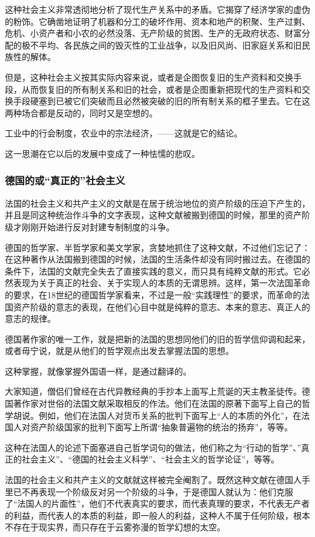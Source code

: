 \documentclass[10pt, UTF8]{book} %
\begin{document}
这种社会主义非常透彻地分析了现代生产关系中的矛盾。它揭穿了经济学家的虚伪的粉饰。它确凿地证明了机器和分工的破坏作用、资本和地产的积聚、生产过剩、危机、小资产者和小农的必然没落、无产阶级的贫困、生产的无政府状态、财富分配的极不平均、各民族之间的毁灭性的工业战争，以及旧风尚、旧家庭关系和旧民族性的解体。

但是，这种社会主义按其实际内容来说，或者是企图恢复旧的生产资料和交换手段，从而恢复旧的所有制关系和旧的社会，或者是企图重新把现代的生产资料和交换手段硬塞到已被它们突破而且必然被突破的旧的所有制关系的框子里去。它在这两种场合都是反动的，同时又是空想的。

工业中的行会制度，农业中的宗法经济，——这就是它的结论。

这一思潮在它以后的发展中变成了一种怯懦的悲叹。

\subsubsection{德国的或“真正的”社会主义}

法国的社会主义和共产主义的文献是在居于统治地位的资产阶级的压迫下产生的，并且是同这种统治作斗争的文字表现，这种文献被搬到德国的时候，那里的资产阶级才刚刚开始进行反对封建专制制度的斗争。

德国的哲学家、半哲学家和美文学家，贪婪地抓住了这种文献，不过他们忘记了：在这种著作从法国搬到德国的时候，法国的生活条件却没有同时搬过去。在德国的条件下，法国的文献完全失去了直接实践的意义，而只具有纯粹文献的形式。它必然表现为关于真正的社会、关于实现人的本质的无谓思辨。这样，第一次法国革命的要求，在18世纪的德国哲学家看来，不过是一般“实践理性”的要求，而革命的法国资产阶级的意志的表现，在他们心目中就是纯粹的意志、本来的意志、真正人的意志的规律。

德国著作家的唯一工作，就是把新的法国的思想同他们的旧的哲学信仰调和起来，或者毋宁说，就是从他们的哲学观点出发去掌握法国的思想。

这种掌握，就像掌握外国语一样，是通过翻译的。

大家知道，僧侣们曾经在古代异教经典的手抄本上面写上荒诞的天主教圣徒传。德国著作家对世俗的法国文献采取相反的作法。他们在法国的原著下面写上自己的哲学胡说。例如，他们在法国人对货币关系的批判下面写上“人的本质的外化”，在法国人对资产阶级国家的批判下面写上所谓“抽象普遍物的统治的扬弃”，等等。

这种在法国人的论述下面塞进自己哲学词句的做法，他们称之为“行动的哲学”、”真正的社会主义”、“德国的社会主义科学”、“社会主义的哲学论证”，等等。

法国的社会主义和共产主义的文献就这样被完全阉割了。既然这种文献在德国人手里已不再表现一个阶级反对另一个阶级的斗争，于是德国人就认为：他们克服了“法国人的片面性”，他们不代表真实的要求，而代表真理的要求，不代表无产者的利益，而代表人的本质的利益，即一般人的利益，这种人不属于任何阶级，根本不存在于现实界，而只存在于云雾弥漫的哲学幻想的太空。
\end{document}
